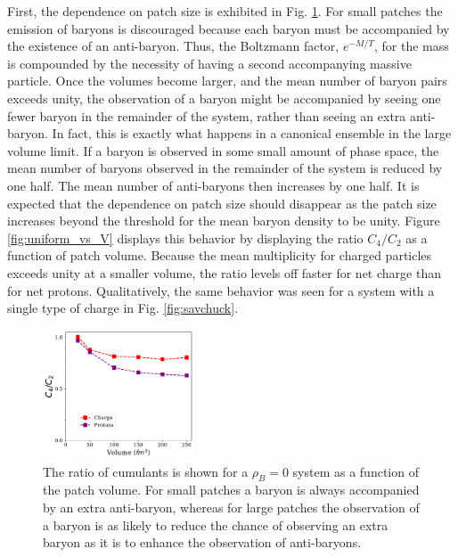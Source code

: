 First, the dependence on patch size is exhibited in  Fig. \ref{fig:uniform_vs_volume}. For small patches the emission of baryons is discouraged because each baryon must be accompanied by the existence of an anti-baryon. Thus, the Boltzmann factor, $e^{-M/T}$, for the mass is compounded by the necessity of having a second accompanying massive particle. Once the volumes become larger, and the mean number of baryon pairs exceeds unity, the observation of a baryon might be accompanied by seeing one fewer baryon in the remainder of the system, rather than seeing an extra anti-baryon. In fact, this is exactly what happens in a canonical ensemble in the large volume limit. If a baryon is observed in some small amount of phase space, the mean number of baryons observed in the remainder of the system is reduced by one half. The mean number of anti-baryons then increases by one half. It is expected that the dependence on patch size should disappear as the patch size increases beyond the threshold for the mean baryon density to be unity. Figure \ref{fig:uniform_vs_V} displays this behavior by displaying the ratio $C_4/C_2$ as a function of patch volume. Because the mean multiplicity for charged particles exceeds unity at a smaller volume, the ratio levels off faster for net charge than for net protons. Qualitatively, the same behavior was seen for a system with a single type of charge in Fig. \ref{fig:savchuck}.
\begin{figure}
\centerline{\includegraphics[width=0.4\textwidth]{figs/m_vs_volume}}
\caption{\label{fig:uniform_vs_volume}
The ratio of cumulants is shown for a $\rho_B=0$ system as a function of the patch volume. For small patches a baryon is always accompanied by an extra anti-baryon, whereas for large patches the observation of a baryon is as likely to reduce the chance of observing an extra baryon as it is to enhance the observation of anti-baryons.}
\end{figure}

